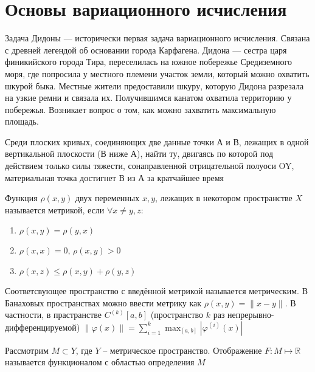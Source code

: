 \documentclass[document.tex]{subfiles}
\begin{document}
\section{Основы вариационного исчисления}
\begin{example}
    Задача Дидоны — исторически первая задача вариационного исчисления. Связана с древней легендой об основании города Карфагена. Дидона — сестра царя финикийского города Тира, переселилась на южное побережье Средиземного моря, где попросила у местного племени участок земли, который можно охватить шкурой быка. Местные жители предоставили шкуру, которую Дидона разрезала на узкие ремни и связала их. Получившимся канатом охватила территорию у побережья. Возникает вопрос о том, как можно захватить максимальную площадь.
\end{example}

\begin{example}
    Среди плоских кривых, соединяющих две данные точки А и В, лежащих в одной вертикальной плоскости (В ниже А), найти ту, двигаясь по которой под действием только силы тяжести, сонаправленной отрицательной полуоси OY, материальная точка достигнет В из А за кратчайшее время
\end{example}

\begin{definition}
    Функция $\rho(x, y)$ двух переменных $x, y$, лежащих в некотором пространстве $X$ называется метрикой, если $\forall
    x \neq y, z$:
    \begin{enumerate}
        \item $\rho(x, y) = \rho(y, x)$
        \item $\rho(x, x) = 0$, $\rho(x, y) > 0$
        \item $\rho(x, z) \leq \rho(x, y) + \rho(y, z)$
    \end{enumerate}
\end{definition}

\begin{remark}
    Соответсвующее пространство с введённой метрикой называется метрическим. В Банаховых пространствах можно ввести
    метрику как $\rho(x, y) = \|x - y\|$. В частности, в прастранстве $C^{(k)}[a, b]$ (пространство $k$ раз
    непрерывно-дифференцируемой) $\|\varphi(x)\| = \sum_{i = 1}^k \max_{[a, b]}|\varphi^{(i)}(x)|$
\end{remark}

\begin{definition}
    Рассмотрим $M \subset Y$, где $Y$ -- метрическое пространство. Отображение $F: M \mapsto \mathbb{R}$ называется
    функционалом с областью определения $M$
\end{definition}
\end{document}
